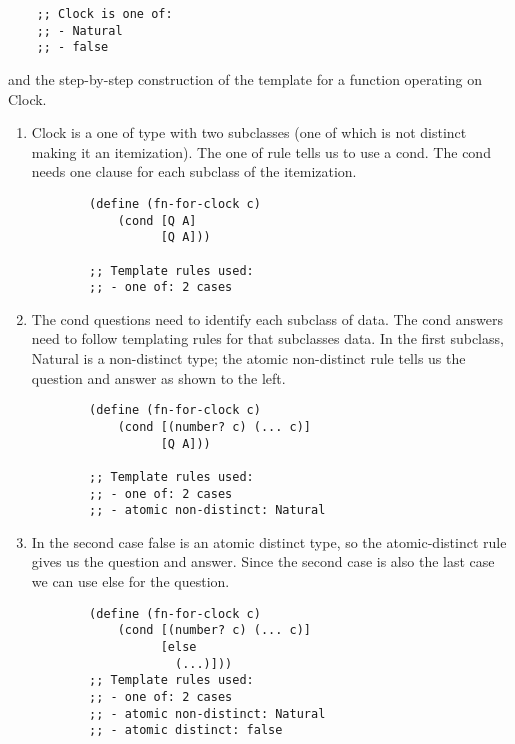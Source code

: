 \documentclass[11pt,a4paper]{report}
\begin{document}
	\begin{verbatim}
	;; Clock is one of:
	;; - Natural
	;; - false
	\end{verbatim}
	and the step-by-step construction of the template for a function operating on Clock.
	\begin{enumerate}
		\item Clock is a one of type with two subclasses (one of which is not distinct
		making it an itemization). The one of rule tells us to use a cond. The cond
		needs one clause for each subclass of the itemization.
		\begin{verbatim}
		(define (fn-for-clock c)
			(cond [Q A]
			      [Q A]))
			      
		;; Template rules used:
		;; - one of: 2 cases
		\end{verbatim}

		\item The cond questions need to identify each subclass of data. The cond answers
		need to follow templating rules for that subclasses data. In the first subclass,
		Natural is a non-distinct type; the atomic non-distinct rule tells us the
		question and answer as shown to the left.
		\begin{verbatim}
		(define (fn-for-clock c)
			(cond [(number? c) (... c)]
			      [Q A]))
			      
		;; Template rules used:
		;; - one of: 2 cases
		;; - atomic non-distinct: Natural
		\end{verbatim}
		
		\item In the second case false is an atomic distinct type, so the atomic-distinct
		rule gives us the question and answer. Since the second case is also the last
		case we can use else for the question.
		\begin{verbatim}
		(define (fn-for-clock c)
			(cond [(number? c) (... c)]
			      [else
			        (...)]))
		;; Template rules used:
		;; - one of: 2 cases
		;; - atomic non-distinct: Natural
		;; - atomic distinct: false
		\end{verbatim}
	\end{enumerate}
\end{document}
